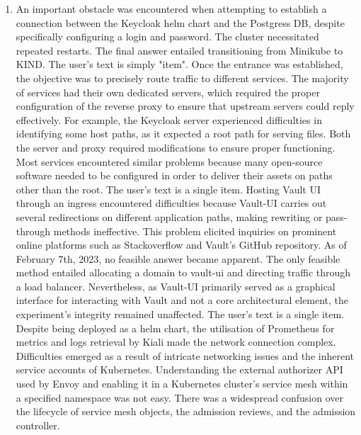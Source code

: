 \documentclass[preprint,12pt]{elsarticle}
\begin{document}
\begin{enumerate}[resume] 
  \item An important obstacle was encountered when attempting to establish a connection between the Keycloak helm chart and the Postgress DB, despite specifically configuring a login and password. The cluster necessitated repeated restarts. The final answer entailed transitioning from Minikube to KIND.
    The user's text is simply "item". Once the entrance was established, the objective was to precisely route traffic to different services. The majority of services had their own dedicated servers, which required the proper configuration of the reverse proxy to ensure that upstream servers could reply effectively. For example, the Keycloak server experienced difficulties in identifying some host paths, as it expected a root path for serving files. Both the server and proxy required modifications to ensure proper functioning. Most services encountered similar problems because many open-source software needed to be configured in order to deliver their assets on paths other than the root.
    The user's text is a single item. Hosting Vault UI through an ingress encountered difficulties because Vault-UI carries out several redirections on different application paths, making rewriting or pass-through methods ineffective. This problem elicited inquiries on prominent online platforms such as Stackoverflow and Vault's GitHub repository. As of February 7th, 2023, no feasible answer became apparent. The only feasible method entailed allocating a domain to vault-ui and directing traffic through a load balancer. Nevertheless, as Vault-UI primarily served as a graphical interface for interacting with Vault and not a core architectural element, the experiment's integrity remained unaffected.
    The user's text is a single item. Despite being deployed as a helm chart, the utilisation of Prometheus for metrics and logs retrieval by Kiali made the network connection complex. Difficulties emerged as a result of intricate networking issues and the inherent service accounts of Kubernetes. Understanding the external authorizer API used by Envoy and enabling it in a Kubernetes cluster's service mesh within a specified namespace was not easy. There was a widespread confusion over the lifecycle of service mesh objects, the admission reviews, and the admission controller.
\end{enumerate}
\end{document}
